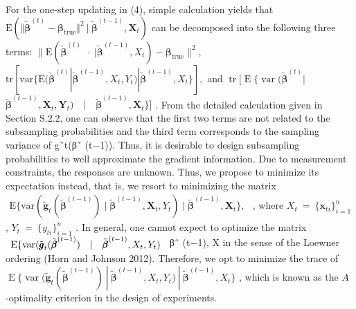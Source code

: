 \documentclass[
  10
]{article}
\begin{document}
For the one-step updating in (4), simple calculation yields that
\(\mathrm { E } ( \Vert \tilde { \pmb { \beta } } ^ { ( t ) } - \pmb { \beta } _ { \mathrm { t r u e } } \Vert ^ { 2 } \ \vert \ \tilde { \pmb { \beta } } ^ { ( t - 1 ) } , \boldsymbol { X } _ { t } )\)
can be decomposed into the following three terms:
\(\| \mathrm { E } ( \tilde { \pmb { \beta } } ^ { ( t ) } \mathrm { ~  ~ \cdot ~ } | \tilde { \pmb { \beta } } ^ { ( t - 1 ) } , X _ { t } ) - \pmb { \beta } _ { \mathrm { t r u e } } \| ^ { 2 } ,\)
\(\mathrm { t r } [ \mathrm { v a r } \{ \mathrm { E } ( \tilde { \pmb { \beta } } ^ { ( t ) } | \tilde { \pmb { \beta } } ^ { ( t - 1 ) } , X _ { t } , Y _ { t } ) | \tilde { \pmb { \beta } } ^ { ( t - 1 ) } , X _ { t } \} ] ,\)
and
\(\operatorname { t r } [ \operatorname { E } \{ \operatorname { v a r } ( { \tilde { \boldsymbol { \beta } } } ^ { ( t ) } |\)
\(\tilde { \boldsymbol { \beta } } ^ { ( t - 1 ) } , \boldsymbol { X } _ { t } , \boldsymbol { Y } _ { t } ) \quad | \quad \tilde { \boldsymbol { \beta } } ^ { ( t - 1 ) } , \boldsymbol { X } _ { t } \} ]\)
. From the detailed calculation given in Section S.2.2, one can observe
that the first two terms are not related to the subsampling
probabilities and the third term corresponds to the sampling variance of
g˜t(β˜ (t−1)). Thus, it is desirable to design subsampling probabilities
to well approximate the gradient information. Due to measurement
constraints, the responses are unknown. Thus, we propose to minimize its
expectation instead, that is, we resort to minimizing the matrix
\(\begin{array} { r } { \mathrm { E } \{ \mathrm { v a r } ( \tilde { \pmb g } _ { t } ( \tilde { \pmb \beta } ^ { ( t - 1 ) } ) \mid \tilde { \pmb \beta } ^ { ( t - 1 ) } , \boldsymbol X _ { t } , Y _ { t } ) \mid \tilde { \pmb \beta } ^ { ( t - 1 ) } , \boldsymbol X _ { t } \} , } \end{array}\)
, where
\(X _ { t } ~ = ~ \{ \pmb { x } _ { t i } \} _ { i = 1 } ^ { n }\) ,
\({ Y _ { t } } ~ = ~ \{ y _ { t i } \} _ { i = 1 } ^ { n }\) . In
general, one cannot expect to optimize the matrix
\(\begin{array} { r l } { \mathrm { E } \{ \mathrm { v a r } ( \tilde { \pmb g } _ { t } ( \tilde { \pmb \beta } ^ { ( t - 1 ) } ) } & { { } | \quad \tilde { \pmb \beta } ^ { ( t - 1 ) } , X _ { t } , Y _ { t } ) } \end{array}\)
\textbar{} β˜ (t−1), X in the sense of the Loewner ordering (Horn and
Johnson 2012). Therefore, we opt to minimize the trace of
\(\operatorname { E } \{ \operatorname { v a r } ( \tilde { \pmb { g } } _ { t } ( \tilde { \pmb { \beta } } ^ { ( t - 1 ) } ) \ | \ \tilde { \pmb { \beta } } ^ { ( t - 1 ) } , X _ { t } , Y _ { t } ) \ | \ \tilde { \pmb { \beta } } ^ { ( t - 1 ) } , X _ { t } \}\)
, which is known as the \(A\) -optimality criterion in the design of
experiments.
\end{document}
